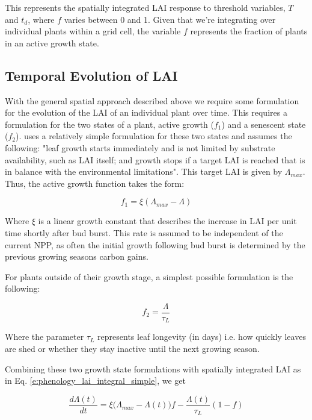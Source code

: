 \documentclass[twoside,10pt]{report}
\begin{document}
This represents the spatially integrated LAI response to threshold variables, $T$ and $t_d$, where $f$ varies between 0 and 1. Given that we're integrating over individual plants within a grid cell, the variable $f$ represents the fraction of plants in an active growth state. 

\subsection{Temporal Evolution of LAI}

With the general spatial approach described above we require some formulation for the evolution of the LAI of an individual plant over time. This requires a formulation for the two states of a plant, active growth ($f_1$) and a senescent state ($f_2$). \citet{Knorr2010} uses a relatively simple formulation for these two states and assumes the following: "leaf growth starts immediately and is not limited by substrate availability, such as LAI itself; and growth stops if a target LAI is reached that is in balance with the environmental limitations". This target LAI is given by $\Lambda_{max}$. Thus, the active growth function takes the form:

\begin{equation}
\label{e:phenology_lai_f1}
    f_1 = \xi (\Lambda_{max} - \Lambda)
\end{equation}

Where $\xi$ is a linear growth constant that describes the increase in LAI per unit time shortly after bud burst. This rate is assumed to be independent of the current NPP, as often the initial growth following bud burst is determined by the previous growing seasons carbon gains. 

For plants outside of their growth stage, a simplest possible formulation is the following:

\begin{equation}
\label{e:phenology_lai_f2}
    f_2 = \frac{\Lambda}{\tau_L}
\end{equation}

Where the parameter $\tau_L$ represents leaf longevity (in days) i.e. how quickly leaves are shed or whether they stay inactive until the next growing season. 

Combining these two growth state formulations with spatially integrated LAI as in Eq. \ref{e:phenology_lai_integral_simple}, we get

\begin{equation}
\label{e:phenology_lai_integral_f1f2}
    \frac{d\Lambda(t)}{dt} = \xi \big( \Lambda_{max} - \Lambda(t) \big) f - \frac{\Lambda(t)}{\tau_L} (1 - f)
\end{equation}
\end{document}
